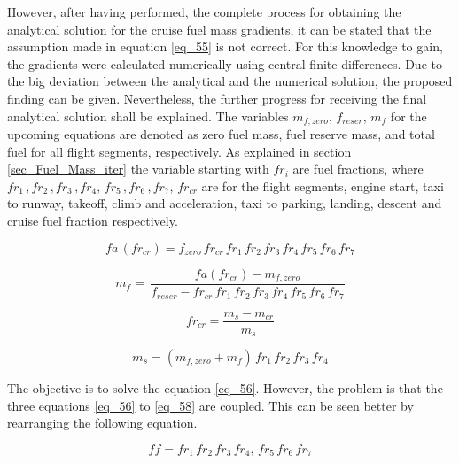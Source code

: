 However, after having performed, the complete 
process for obtaining the analytical solution 
for the cruise fuel mass gradients, 
it can be stated that the assumption
made in equation \eqref{eq_55} is 
not correct. For this knowledge to gain, 
the gradients were calculated numerically  
using central finite differences.
Due to the big deviation between 
the analytical and the numerical 
solution, the proposed finding can be given.
Nevertheless, the further progress for 
receiving the final analytical solution 
shall be explained. The variables $m_{f,zero},\,
f_{reser}, \, m_f$ for 
the upcoming equations are 
denoted as zero fuel mass, fuel reserve 
mass, and total 
fuel for all flight segments, respectively. 
As explained in section \ref{sec_Fuel_Mass_iter}
the variable starting with $fr_i$ are fuel 
fractions, where  
$fr_1 \,, fr_2\,,fr_3 \,, fr_4,\, fr_5\,, fr_6\, , fr_7, \,
fr_{cr}$ 
are for the  
flight segments, engine start, taxi to runway, takeoff,
climb and acceleration, taxi to parking,
landing, descent and cruise fuel fraction respectively.


\begin{equation}
    \label{eq_55_Fcr}
    fa \,(fr_{cr}) = f_{zero} \, fr_{cr} \, fr_1 \, fr_2\,fr_3 \, fr_4 \, 
    fr_5\, fr_6\, fr_7
\end{equation}

\begin{equation}
    \label{eq_56}
    m_{f} = \,\frac{fa (fr_{cr}) - m_{f,zero}}{f_{reser} -fr_{cr} 
    \,fr_1 \, fr_2\,fr_3 \, fr_4 \, 
    fr_5\, fr_6\, fr_7 }
\end{equation}

\begin{equation}
    \label{eq_57}
    fr_{cr} =  \frac{m_s - m_{cr}}{m_s}
\end{equation}

\begin{equation}
    \label{eq_58}
    m_s = (m_{f,zero} + m_{f})  \, fr_1 \, fr_2\,fr_3 \, fr_4
\end{equation}


The objective is to solve the equation \eqref{eq_56}. However, the 
problem is that the three equations \eqref{eq_56} to \eqref{eq_58}
are coupled. This can be seen better by rearranging the following 
equation. 

\begin{equation}
    \label{eq_59}
    ff = fr_1 \, fr_2\,fr_3 \, fr_4 ,\, fr_5\, fr_6\, fr_7 
\end{equation}

